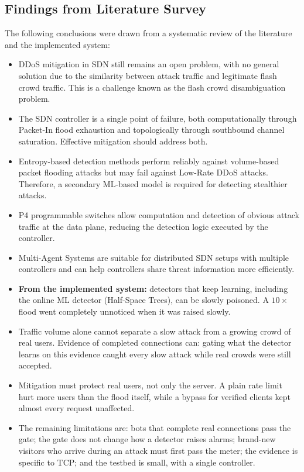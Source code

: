 \documentclass[12pt,a4paper]{article}
\begin{document}
\subsection{Findings from Literature Survey}
The following conclusions were drawn from a systematic review of the literature
and the implemented system:
\begin{itemize}
  \item DDoS mitigation in SDN still remains an open problem, with no general
  solution due to the similarity between attack traffic and legitimate flash
  crowd traffic. This is a challenge known as the flash crowd disambiguation
  problem.
  \item The SDN controller is a single point of failure, both computationally
  through Packet-In flood exhaustion and topologically through southbound
  channel saturation. Effective mitigation should address both.
  \item Entropy-based detection methods perform reliably against volume-based
  packet flooding attacks but may fail against Low-Rate DDoS attacks. Therefore,
  a secondary ML-based model is required for detecting stealthier attacks.
  \item P4 programmable switches allow computation and detection of obvious
  attack traffic at the data plane, reducing the detection logic executed by the
  controller.
  \item Multi-Agent Systems are suitable for distributed SDN setups with multiple
  controllers and can help controllers share threat information more
  efficiently.
  \item \textbf{From the implemented system:} detectors that keep learning,
  including the online ML detector (Half-Space Trees), can be slowly poisoned.
  A $10\times$ flood went completely unnoticed when it was raised slowly.
  \item Traffic volume alone cannot separate a slow attack from a growing crowd
  of real users. Evidence of completed connections can: gating what the detector
  learns on this evidence caught every slow attack while real crowds were still
  accepted.
  \item Mitigation must protect real users, not only the server. A plain rate
  limit hurt more users than the flood itself, while a bypass for verified
  clients kept almost every request unaffected.
  \item The remaining limitations are: bots that complete real connections pass
  the gate; the gate does not change how a detector raises alarms; brand-new
  visitors who arrive during an attack must first pass the meter; the evidence
  is specific to TCP; and the testbed is small, with a single controller.
\end{itemize}
\end{document}
